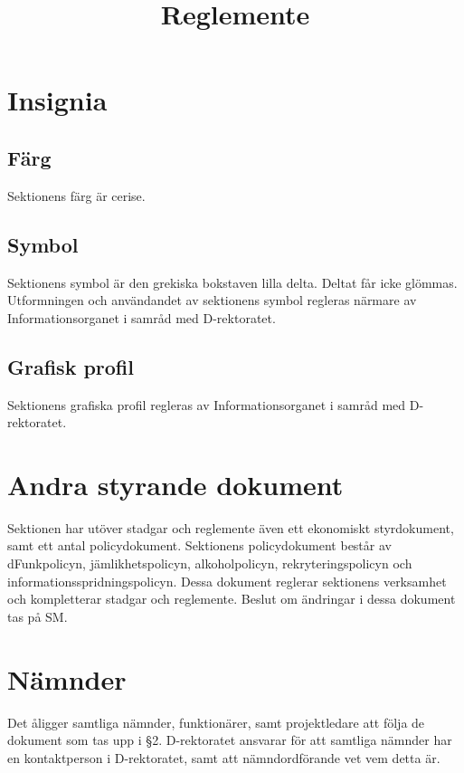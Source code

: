 \documentclass{dgovdoc}
\title{Reglemente}
\begin{document}
\maketitle

\section{Insignia}

\subsection{Färg}

Sektionens färg är cerise.

\subsection{Symbol}

Sektionens symbol är den grekiska bokstaven lilla delta. Deltat får icke
glömmas. Utformningen och användandet av sektionens symbol regleras närmare av
Informationsorganet i samråd med D-rektoratet.

\subsection{Grafisk profil}

Sektionens grafiska profil regleras av Informationsorganet i samråd med
D-rektoratet.

\section{Andra styrande dokument}

Sektionen har utöver stadgar och reglemente även ett ekonomiskt styrdokument, samt
ett antal policydokument. Sektionens policydokument består av dFunkpolicyn, jämlikhetspolicyn,
alkoholpolicyn, rekryteringspolicyn och informationsspridningspolicyn.
Dessa dokument reglerar sektionens verksamhet och kompletterar stadgar och reglemente.
Beslut om ändringar i dessa dokument tas på SM.

\section{Nämnder}

Det åligger samtliga nämnder, funktionärer, samt projektledare att följa de dokument
som tas upp i §2. D-rektoratet ansvarar för att samtliga nämnder har en kontaktperson
i D-rektoratet, samt att nämndordförande vet vem detta är.
\end{document}
